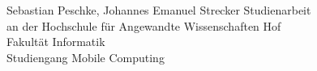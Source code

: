 \begin{titlepage}
    \begin{center}


        \vspace{0.5cm}
        Sebastian Peschke, Johannes Emanuel Strecker
        \vfill
        Studienarbeit\\
        an der Hochschule für Angewandte Wissenschaften Hof\\
        Fakultät Informatik\\
        Studiengang Mobile Computing\\

    \end{center}


\end{titlepage}